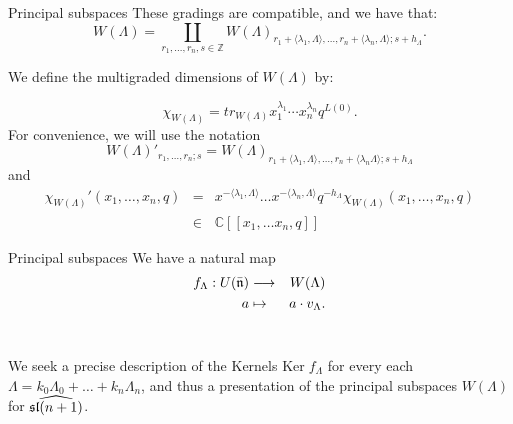 \documentclass{beamer}
\begin{document}
\begin{frame}{Principal subspaces}
These gradings are compatible, and we have that:
\begin{equation*} \label{WTripleGrading}
W(\Lambda) = \coprod_{r_1,\dots,r_n,s \in \mathbb{Z}} W(\Lambda)_{r_1+\langle\lambda_1,\Lambda\rangle,\dots,  r_n+\langle\lambda_n,\Lambda\rangle;s+h_{\Lambda}}.
\end{equation*}

We define the multigraded dimensions of $W(\Lambda)$ by:

$$
\chi_{W(\Lambda)}=tr_{W(\Lambda)}x_1^{\lambda_1}\cdots x_n^{\lambda_n} q^{L(0)}.
$$
\pause
For convenience, we will use the notation
$$ W(\Lambda)'_{r_1,\dots,
  r_n;s}=W(\Lambda)_{r_1+\langle\lambda_1,\Lambda\rangle,\dots,
  r_n+\langle\lambda_n\Lambda\rangle;s+h_{\Lambda}}
$$
and
\begin{eqnarray*}
\chi_{W(\Lambda)}'(x_1,\dots,x_n, q)&=& x^{-\langle \lambda_1, \Lambda \rangle} \dots
x^{-\langle \lambda_n, \Lambda \rangle} q^{-h_\Lambda}\chi_{W(\Lambda)}(x_1,\dots,x_n, q)\\
&\in& 
\mathbb{C}[[x_1, \dots x_n, q]] 
\end{eqnarray*}
\end{frame}



\begin{frame}{Principal subspaces}
We have a natural map
\begin{eqnarray*} 
f_{\Lambda}: U(\bar{\frak{n}}) & \longrightarrow &
W(\Lambda)\\ a & \mapsto & a \cdot v_{\Lambda}. \nonumber
\end{eqnarray*}\\
\vspace{0.2in}

We seek a precise description of the
Kernels $\mbox{Ker} \; f_{\Lambda}$ for every each $\Lambda =k_0\Lambda_0 + \dots + k_n\Lambda_n$, and thus a presentation of the principal subspaces $W(\Lambda)$ for $\widehat{\frak{sl}(n+1)}$.
\end{frame}
\end{document}
